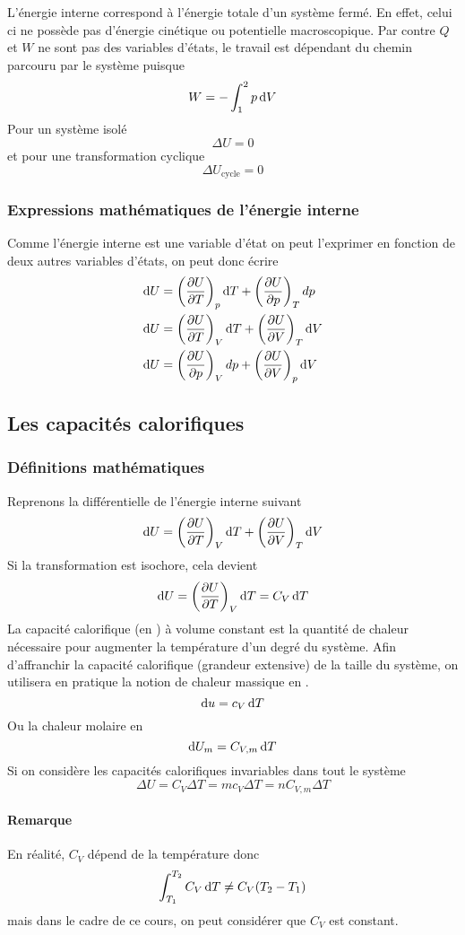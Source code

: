 L'énergie interne correspond à l'énergie totale d'un système fermé.
En effet, celui ci ne possède pas d'énergie cinétique ou
potentielle macroscopique.
Par contre $Q$ et $W$ ne sont pas des variables d'états,
le travail est dépendant du chemin parcouru par le système puisque
\[W = - \int_1^2p\operatorname{d}\! V \]
Pour un système isolé
\[ \Delta U = 0 \]
et pour une transformation cyclique
\[ \Delta U_\mathrm{cycle} = 0 \]

\subsubsection{Expressions mathématiques de l'énergie interne}
Comme l'énergie interne est une variable d'état on peut l'exprimer en
fonction de deux autres variables d'états, on peut donc écrire
\begin{align*}
  \operatorname{d}\! U & =
  \left(\frac{\partial U}{\partial T}\right)_p \operatorname{d}\! T +
  \left(\frac{\partial U}{\partial p}\right)_T dp\\
  \operatorname{d}\! U & =
  \left(\frac{\partial U}{\partial T}\right)_V \operatorname{d}\! T +
  \left(\frac{\partial U}{\partial V}\right)_T \operatorname{d}\! V\\
  \operatorname{d}\! U & =
  \left(\frac{\partial U}{\partial p}\right)_V dp +
  \left(\frac{\partial U}{\partial V}\right)_p \operatorname{d}\! V
\end{align*}

\subsection{Les capacités calorifiques}
\subsubsection{Définitions mathématiques}
Reprenons la différentielle de l'énergie interne suivant
\[ \operatorname{d}\! U = \left(\frac{\partial U}{\partial T}\right)_V \operatorname{d}\! T +
\left(\frac{\partial U}{\partial V}\right)_T \operatorname{d}\! V \]
Si la transformation est isochore, cela devient
\[ \operatorname{d}\! U = \left(\frac{\partial U}{\partial T}\right)_V \operatorname{d}\! T = C_V \operatorname{d}\! T \]
La capacité calorifique (en \joule\per\kelvin) à volume constant est
la quantité de chaleur nécessaire pour
augmenter la température d'un degré du système.
Afin d'affranchir la capacité calorifique (grandeur extensive)
de la taille du système, on utilisera en pratique
la notion de chaleur massique en \joule\per\kilogram\cdot\kelvin.
\[ \operatorname{d}\! u = c_V\operatorname{d}\! T \]
Ou la chaleur molaire en \joule\per\mole\cdot\kelvin
\[ \operatorname{d}\! U_m = C_{V,m}\operatorname{d}\! T \]
Si on considère les capacités calorifiques invariables dans tout le système
\[ \Delta U = C_V \Delta T = mc_V\Delta T = nC_{V,m}\Delta T \]

\paragraph{Remarque}
En réalité, $C_V$ dépend de la température donc
\[ \int_{T_1}^{T_2} C_V \operatorname{d}\! T \neq C_V(T_2 - T_1) \]
mais dans le cadre de ce cours, on peut considérer que $C_V$ est constant.

